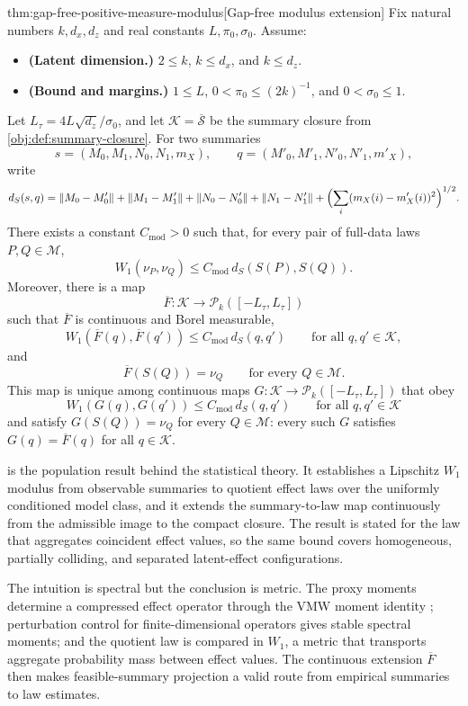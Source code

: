 \documentclass[11pt]{article}
\begin{document}
\begin{theoremv}{thm:gap-free-positive-measure-modulus}[Gap-free modulus extension]
Fix natural numbers \(k,d_x,d_z\) and real constants \(L,\pi_0,\sigma_0\).  Assume:
\begin{itemize}
\item \textbf{(Latent dimension.)} \(2\le k\), \(k\le d_x\), and \(k\le d_z\).
\item \textbf{(Bound and margins.)} \(1\le L\), \(0<\pi_0\le (2k)^{-1}\), and \(0<\sigma_0\le 1\).
\end{itemize}
Let \(L_\tau=4L\sqrt{d_z}/\sigma_0\), and let \(\mathcal K=\overline{\mathscr S}\) be the summary closure from \cref{obj:def:summary-closure}.  For two summaries
\[
s=(M_0,M_1,N_0,N_1,m_X),
\qquad
q=(M'_0,M'_1,N'_0,N'_1,m'_X),
\]
write
\[
d_S(s,q)
=
\|M_0-M'_0\|+\|M_1-M'_1\|
+\|N_0-N'_0\|+\|N_1-N'_1\|
+\Bigl(\sum_i (m_X(i)-m'_X(i))^2\Bigr)^{1/2}.
\]
There exists a constant \(C_{\mathrm{mod}}>0\) such that, for every pair of full-data laws \(P,Q\in\mathcal M\),
\[
W_1(\nu_P,\nu_Q)\le C_{\mathrm{mod}}\,d_S(S(P),S(Q)).
\]
Moreover, there is a map
\[
\overline F:\mathcal K\to \mathcal P_k([-L_\tau,L_\tau])
\]
such that \(\overline F\) is continuous and Borel measurable,
\[
W_1(\overline F(q),\overline F(q'))
\le C_{\mathrm{mod}}\,d_S(q,q')
\qquad\text{for all }q,q'\in\mathcal K,
\]
and
\[
\overline F(S(Q))=\nu_Q
\qquad\text{for every }Q\in\mathcal M.
\]
This map is unique among continuous maps \(G:\mathcal K\to\mathcal P_k([-L_\tau,L_\tau])\) that obey
\[
W_1(G(q),G(q'))
\le C_{\mathrm{mod}}\,d_S(q,q')
\qquad\text{for all }q,q'\in\mathcal K
\]
and satisfy \(G(S(Q))=\nu_Q\) for every \(Q\in\mathcal M\): every such \(G\) satisfies \(G(q)=\overline F(q)\) for all \(q\in\mathcal K\).
\end{theoremv}

 is the population result behind the statistical theory. It establishes a Lipschitz \(W_1\) modulus from observable summaries to quotient effect laws over the uniformly conditioned model class, and it extends the summary-to-law map continuously from the admissible image to the compact closure. The result is stated for the law that aggregates coincident effect values, so the same bound covers homogeneous, partially colliding, and separated latent-effect configurations.

The intuition is spectral but the conclusion is metric. The proxy moments determine a compressed effect operator through the VMW moment identity \citep{VirkMazaheriWu2026}; perturbation control for finite-dimensional operators \citep{BauerFike1960,Kato1995} gives stable spectral moments; and the quotient law is compared in \(W_1\), a metric that transports aggregate probability mass between effect values. The continuous extension \(\overline F\) then makes feasible-summary projection a valid route from empirical summaries to law estimates.
\end{document}
